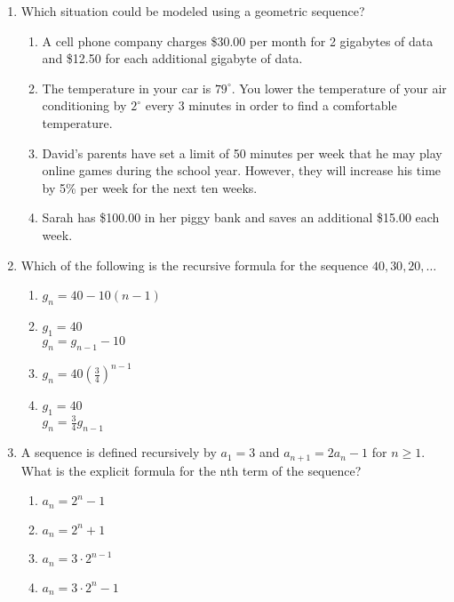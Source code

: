 \documentclass[12pt, twoside]{article}
\begin{document}
\begin{enumerate}[itemsep=0.5cm]
\newpage

\item Which situation could be modeled using a geometric sequence?
\begin{enumerate}
    \item A cell phone company charges \$30.00 per month for 2 gigabytes of data and \$12.50 for each additional gigabyte of data.
    \item The temperature in your car is $79^\circ$. You lower the temperature of your air conditioning by $2^\circ$ every 3 minutes in order to find a comfortable temperature.
    \item David's parents have set a limit of 50 minutes per week that he may play online games during the school year. However, they will increase his time by 5\% per week for the next ten weeks.
    \item Sarah has \$100.00 in her piggy bank and saves an additional \$15.00 each week.
\end{enumerate}

\item Which of the following is the recursive formula for the sequence $40, 30, 20, \ldots$
  \begin{multicols}{2}
  \begin{enumerate}
    \item $g_n = 40 -10(n-1)$
    \item $g_1 = 40$ \\ $g_n = g_{n-1} -10$
    \item $g_n = 40 \left( \frac{3}{4} \right)^{n-1}$
    \item $g_1 = 40$ \\ $g_n = \frac{3}{4} g_{n-1}$
  \end{enumerate}
  \end{multicols}

\item A sequence is defined recursively by $a_1 = 3$ and $a_{n+1} = 2a_n - 1$ for $n \geq 1$. What is the explicit formula for the nth term of the sequence? %
\begin{enumerate}
    \item $a_n = 2^n - 1$
    \item $a_n = 2^n + 1$
    \item $a_n = 3 \cdot 2^{n-1}$
    \item $a_n = 3 \cdot 2^n - 1$
\end{enumerate}


\end{enumerate}
\end{document}
